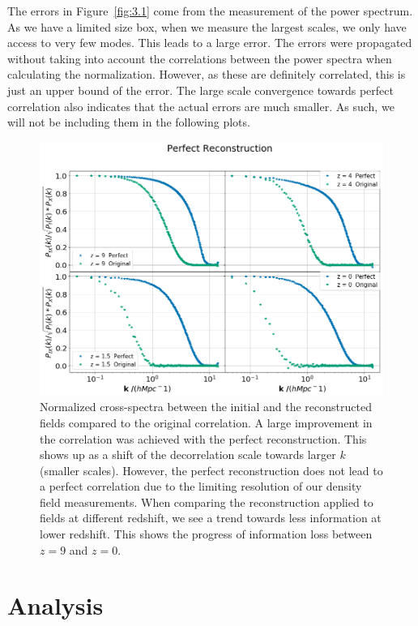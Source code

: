 The errors in Figure~\ref{fig:3.1} come from the measurement of the power spectrum. As we have a limited size box, when we measure the largest scales, we only have access to very few modes. This leads to a large error. The errors were propagated without taking into account the correlations between the power spectra when calculating the normalization. However, as these are definitely correlated, this is just an upper bound of the error. The large scale convergence towards perfect correlation also indicates that the actual errors are much smaller. As such, we will not be including them in the following plots.

\begin{figure}
    \centering
    \includegraphics[width=1\columnwidth]{images/perfRecon/perfRecon.png}%
    
    \caption{
    Normalized cross-spectra between the initial and the reconstructed fields compared to the original correlation. A large improvement in the correlation was achieved with the perfect reconstruction. This shows up as a shift of the decorrelation scale towards larger $k$ (smaller scales). However, the perfect reconstruction does not lead to a perfect correlation due to the limiting resolution of our density field measurements. When comparing the reconstruction applied to fields at different redshift, we see a trend towards less information at lower redshift. This shows the progress of information loss between $z=9$ and $z=0$.
    }
    
    \label{fig:3.2}
\end{figure}

\section{Analysis}

